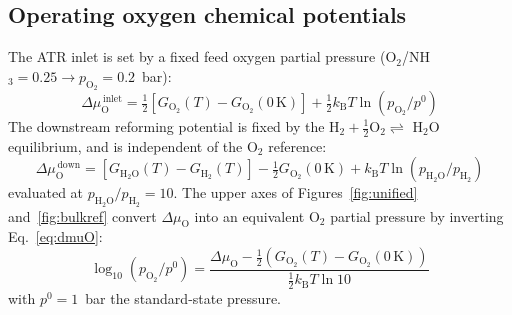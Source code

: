 \subsection*{Operating oxygen chemical potentials}
The ATR inlet is set by a fixed feed oxygen partial pressure
(O$_2$/NH$_3 = 0.25 \rightarrow p_{\mathrm{O_2}} = 0.2$~bar):
\begin{equation}
  \Delta\mu_{\mathrm O}^{\,\mathrm{inlet}} =
  \tfrac{1}{2}\left[G_{\mathrm{O_2}}(T) - G_{\mathrm{O_2}}(0\,\mathrm{K})\right]
  + \tfrac{1}{2}k_{\mathrm B}T\ln\!\left(p_{\mathrm{O_2}}/p^{0}\right)
  \label{eq:inlet}
\end{equation}
The downstream reforming potential is fixed by the
H$_2 + \tfrac{1}{2}$O$_2 \rightleftharpoons$ H$_2$O equilibrium, and is
independent of the O$_2$ reference:
\begin{equation}
  \Delta\mu_{\mathrm O}^{\,\mathrm{down}} =
  \left[G_{\mathrm{H_2O}}(T) - G_{\mathrm{H_2}}(T)\right]
  - \tfrac{1}{2}G_{\mathrm{O_2}}(0\,\mathrm{K})
  + k_{\mathrm B}T\ln\!\left(p_{\mathrm{H_2O}}/p_{\mathrm{H_2}}\right)
  \label{eq:down}
\end{equation}
evaluated at $p_{\mathrm{H_2O}}/p_{\mathrm{H_2}}=10$. The upper axes of
Figures~\ref{fig:unified} and~\ref{fig:bulkref} convert $\Delta\mu_{\mathrm O}$
into an equivalent O$_2$ partial pressure by
inverting Eq.~\eqref{eq:dmuO}:
\begin{equation}
  \log_{10}\!\left(p_{\mathrm{O_2}}/p^{0}\right) =
  \frac{\Delta\mu_{\mathrm O}
  - \tfrac{1}{2}\left(G_{\mathrm{O_2}}(T) - G_{\mathrm{O_2}}(0\,\mathrm{K})\right)}
       {\tfrac{1}{2}k_{\mathrm B}T\ln 10}
  \label{eq:pO2}
\end{equation}
with $p^{0}=1$~bar the standard-state pressure.

